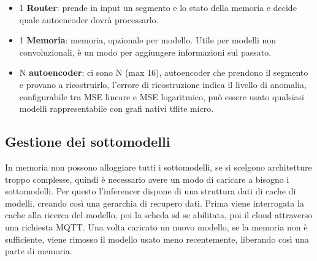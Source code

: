 

\begin{itemize}
	\item 1 \textbf{Router}: prende in input un segmento e lo stato della memoria e decide quale autoencoder dovrà processarlo.
	\item 1 \textbf{Memoria}: memoria, opzionale per modello. Utile per modelli non convoluzionali, è un modo per aggiungere informazioni sul passato.
	\item N \textbf{autoencoder}: ci sono N (max 16), autoencoder che prendono il segmento e provano a ricostruirlo, l'errore di ricostruzione indica il livello di anomalia, configurabile tra MSE lineare e MSE logaritmico, può essere usato qualsiasi modelli rappresentabile con grafi nativi tflite micro.

\end{itemize}


\subsection{Gestione dei sottomodelli}
In memoria non possono alloggiare tutti i sottomodelli, se si scelgono architetture troppo complesse, quindi è necessario avere un modo di caricare a bisogno i sottomodelli.
Per questo l'inferencer dispone di una struttura dati di cache di modelli, creando così una gerarchia di recupero dati. Prima viene interrogata la cache alla ricerca del modello, poi la scheda sd se abilitata, poi il cloud attraverso una richiesta MQTT.
Una volta caricato un nuovo modello, se la memoria non è sufficiente, viene rimosso il modello usato meno recentemente, liberando così una parte di memoria.



